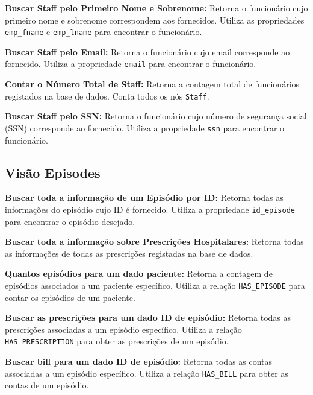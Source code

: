 \vspace{0.15cm}
\textbf{Buscar Staff pelo Primeiro Nome e Sobrenome:} Retorna o funcionário cujo primeiro nome e sobrenome correspondem aos fornecidos. Utiliza as propriedades \texttt{emp\_fname} e \texttt{emp\_lname} para encontrar o funcionário.

\vspace{0.15cm}
\textbf{Buscar Staff pelo Email:} Retorna o funcionário cujo email corresponde ao fornecido. Utiliza a propriedade \texttt{email} para encontrar o funcionário.

\vspace{0.15cm}
\textbf{Contar o Número Total de Staff:} Retorna a contagem total de funcionários registados na base de dados. Conta todos os nós \texttt{Staff}.

\vspace{0.15cm}
\textbf{Buscar Staff pelo SSN:} Retorna o funcionário cujo número de segurança social (SSN) corresponde ao fornecido. Utiliza a propriedade \texttt{ssn} para encontrar o funcionário.

\subsection{Visão Episodes}

\vspace{0.15cm}
\textbf{Buscar toda a informação de um Episódio por ID:} Retorna todas as informações do episódio cujo ID é fornecido. Utiliza a propriedade \texttt{id\_episode} para encontrar o episódio desejado.

\vspace{0.15cm}
\textbf{Buscar toda a informação sobre Prescrições Hospitalares:} Retorna todas as informações de todas as prescrições registadas na base de dados.

\vspace{0.15cm}
\textbf{Quantos episódios para um dado paciente:} Retorna a contagem de episódios associados a um paciente específico. Utiliza a relação \texttt{HAS\_EPISODE} para contar os episódios de um paciente.

\vspace{0.15cm}
\textbf{Buscar as prescrições para um dado ID de episódio:} Retorna todas as prescrições associadas a um episódio específico. Utiliza a relação \texttt{HAS\_PRESCRIPTION} para obter as prescrições de um episódio.

\vspace{0.15cm}
\textbf{Buscar bill para um dado ID de episódio:} Retorna todas as contas associadas a um episódio específico. Utiliza a relação \texttt{HAS\_BILL} para obter as contas de um episódio.

